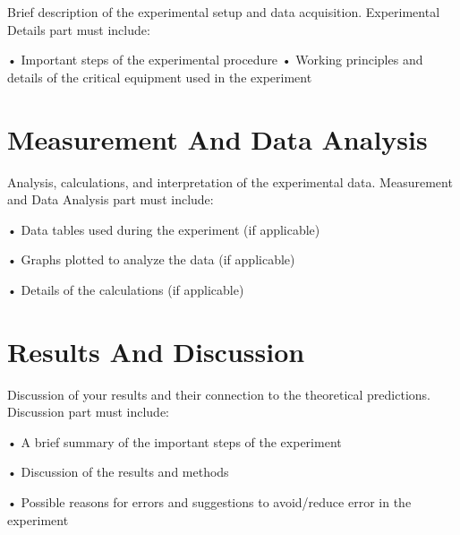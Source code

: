 \documentclass[12pt]{extarticle}
\begin{document}
	Brief description of the experimental setup and data acquisition. Experimental Details part must include:
	
	•	Important steps of the experimental procedure
	•	Working principles and details of the critical equipment used in the experiment
	
	
	\section{Measurement And Data Analysis}
	
	Analysis, calculations, and interpretation of the experimental data. Measurement and Data Analysis part must include:
	
	•	Data tables used during the experiment (if applicable)
	
	•	Graphs plotted to analyze the data (if applicable)
	
	•	Details of the calculations (if applicable) 
	
	
	\section{Results And Discussion}
	
	Discussion of your results and their connection to the theoretical predictions. Discussion part must include:
	
	•	A brief summary of the important steps of the experiment
	
	•	Discussion of the results and methods
	
	•	Possible reasons for errors and suggestions to avoid/reduce error in the experiment 
	
	
	\nocite{*}
			
		
\end{document}

